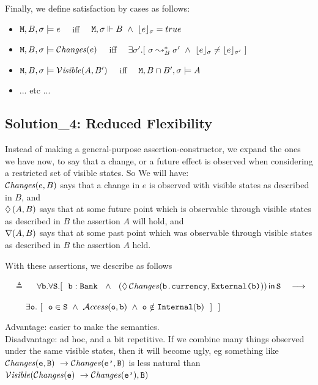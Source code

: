 \documentclass[acmsmall,screen]{acmart}
\begin{document}
Finally, we define   satisfaction by cases as follows:
\begin{itemize}
\item
${\mbox{\tt{M}}}, B, \sigma \models e$ \ \ iff \ \  $ \M, \sigma \Vdash B\ \wedge\  \interp{e}{\sigma} = true$
\item
${\mbox{\tt{M}}}, B, \sigma \models \mathcal{C}\textrm{\textit{hanges}}(e) $  \ \ iff \ \  $\exists \sigma'.  [\ \sigma \leadsto_B^* \sigma' \ \wedge \ \interp{e}{\sigma}\neq \interp{e}{\sigma'}\ ]$
\item
${\mbox{\tt{M}}}, B, \sigma \models  \mathcal{V}\textrm{\textit{isible}}(A,B')$   \ \ iff \ \    ${\mbox{\tt{M}}}, B\cap B', \sigma \models A $
\item
... etc ...
\end{itemize}


\subsection{Solution\_4: Reduced Flexibility}
 
Instead of making a general-purpose assertion-constructor, we expand the ones we have now, to say that a change, or a future effect is observed when considering a restricted set of visible states. So We will have:\\
  $\mathcal{C}\textrm{\textit{hanges}}(e,B)$ says that a change in $e$ is observed with visible states as described in $B$, and \\ $\lozenge\, (A,B)$ says that at some future point which is observable through visible states as described in $B$ the assertion $A$ will hold, and\\
$\nabla (A,B)$ says that at some past point which was observable through visible states as described in $B$ the assertion $A$ held.

With these assertions, we describe  as follows
  
  \ \  $\triangleq$ \ \
  $\forall \prg{b}.\forall \prg{S}.
  [ \ \ \prg{b}:
  \prg{Bank} \ \ \wedge\ \ \Using{(\Future\Changes{\prg{b.currency},\prg{External(b)}})}{\prg{S}} \ \ \ \longrightarrow \ \  $\\
 \strut $~ $ \ \ \ \hspace{2.0in}   
 $\exists \prg{o}. \ [ \ \
  \prg{o}\in \prg{S}\   \wedge\  \CanAccess{\prg{o}}{\prg{b}}\ \wedge\     \prg{o}\notin\prg{Internal}(\prg{b})  
\ \ ] \ \ ]$

\vspace{.3in}
\noindent
Advantage:  easier to make the semantics.
\\
Disadvantage:  ad hoc, and a bit repetitive.
 If we combine many things observed under the same visible states, then it
will become ugly, eg  something like $\Changes{\prg{e},\prg{B}} \ \rightarrow \Changes{\prg{e'},\prg{B}}$ is less natural than $\mathcal{V}\textrm{\textit{isible}}(\mathcal{C}\textrm{\textit{hanges}}({\mbox{\tt{e}}}) \ \rightarrow \mathcal{C}\textrm{\textit{hanges}}({\mbox{\tt{e'}}}),{\mbox{\tt{B}}})$
\end{document}
